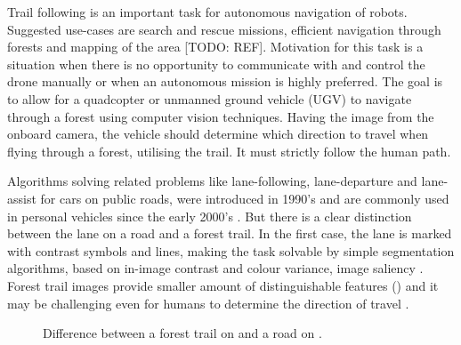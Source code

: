 Trail following is an important task for autonomous navigation of robots. Suggested use-cases are search and rescue missions, efficient navigation through forests and mapping of the area [TODO: REF]. Motivation for this task is a situation when there is no opportunity to communicate with and control the drone manually or when an autonomous mission is highly preferred. The goal is to allow for a quadcopter or unmanned ground vehicle (UGV) to navigate through a forest using computer vision techniques. Having the image from the onboard camera, the vehicle should determine which direction to travel when flying through a forest, utilising the trail. It must strictly follow the human path.

Algorithms solving related problems like lane-following, lane-departure and lane-assist for cars on public roads, were introduced in 1990's \cite{batavia1999driver} and are commonly used in personal vehicles since the early 2000's \cite{chen2020lane}. But there is a clear distinction between the lane on a road and a forest trail. In the first case, the lane is marked with contrast symbols and lines, making the task solvable by simple segmentation algorithms, based on in-image contrast and colour variance, image saliency \cite{santana2013tracking}. Forest trail images provide smaller amount of distinguishable features () and it may be challenging even for humans to determine the direction of travel \cite{giusti2016machine}.

\begin{figure}[!h]
  \centering
  \caption{Difference between a forest trail on  and a road on .}
  \label{fig:features_difference}
\end{figure}


